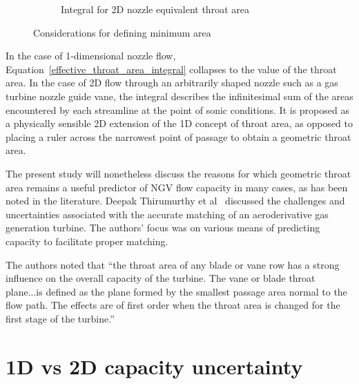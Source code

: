 \documentclass[a4paper, 11pt, oneside]{report}
\begin{document}
\begin{figure}[H]
\begin{subfigure}{.45\textwidth}
		\caption{Integral for 2D nozzle equivalent throat area}
		\label{fig:illustration_of_equivalent_throat_area_integral}
	\end{subfigure}
	\caption{Considerations for defining minimum area}
\end{figure}

In the case of 1-dimensional nozzle flow, Equation~\ref{effective_throat_area_integral} collapses to the value of the throat area. In the case of 2D flow through an arbitrarily shaped nozzle such as a gas turbine nozzle guide vane, the integral describes the infinitesimal sum of the areas encountered by each streamline at the point of sonic conditions. It is proposed as a physically sensible 2D extension of the 1D concept of throat area, as opposed to placing a ruler across the narrowest point of passage to obtain a geometric throat area. 

The present study will nonetheless discuss the reasons for which geometric throat area remains a useful predictor of NGV flow capacity in many cases, as has been noted in the literature. Deepak Thirumurthy et al~\cite{thirumurthy_throat_area} discussed the challenges and uncertainties associated with the accurate matching of an aeroderivative gas generation turbine. The authors' focus was on various means of predicting capacity to facilitate proper matching. 

The authors noted that ``the throat area of any blade or vane row has a strong influence on the overall capacity of the turbine. The vane or blade throat plane...is defined as the plane formed by the smallest passage area normal to the flow path. The effects are of first order when the throat area is changed for the first stage of the turbine.''


\section{1D vs 2D capacity uncertainty}
\label{section_1d_vs_2d_capacity_uncertainty}
\end{document}
